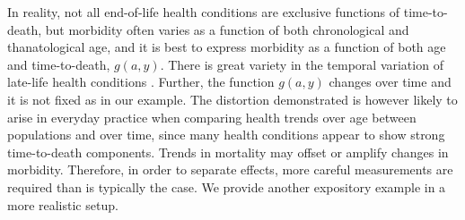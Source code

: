 \documentclass[11pt,oneside,a4paper]{article} %
\begin{document}
In reality, not all end-of-life health conditions are exclusive functions of
time-to-death, but morbidity often varies as a function of
both chronological and thanatological age, and it is best to express morbidity
as a function of both age and time-to-death, $g(a,y)$. There is great variety in
the temporal variation of late-life health conditions \citep{riffe2015ttd}.
Further, the function $g(a,y)$ changes over time and it is not fixed as in our example. The distortion demonstrated is however likely to arise
in everyday practice when comparing health trends over age between populations
and over time, since many health conditions appear to show strong time-to-death
components. Trends in mortality may offset or amplify changes in morbidity.
Therefore, in order to separate effects, more careful measurements are required
than is typically the case. We provide another expository example in a more
realistic setup.



   
\end{document}
